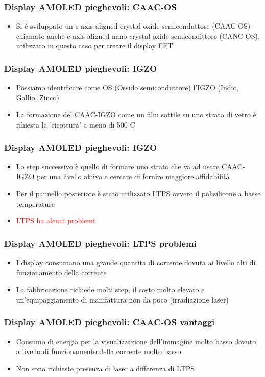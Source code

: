 \documentclass[12pt]{beamer}
\begin{document}
	\begin{frame}
		\frametitle{Display AMOLED pieghevoli: CAAC-OS}
		\begin{itemize}
			\item Si è sviluppato un c-axis-aligned-crystal oxide semiconduttore (CAAC-OS) chiamato anche c-axis-aligned-nano-crystal oxide semicondittore (CANC-OS), utilizzato in questo caso per creare il display FET
		\end{itemize}
	\end{frame}
	\begin{frame}
		\frametitle{Display AMOLED pieghevoli: IGZO}
		\begin{itemize}
			\item Possiamo identificare come OS (Ossido semiconduttore) l'IGZO (Indio, Gallio, Zinco)
			\pause
			\item La formazione del CAAC-IGZO come un film sottile su uno strato di vetro è rihiesta la 'ricottura' a meno di 500 \degree C
		\end{itemize}
	\end{frame}
	\begin{frame}
		\frametitle{Display AMOLED pieghevoli: IGZO}
		\begin{itemize}
			\item Lo step successivo è quello di formare uno strato che va ad usare CAAC-IGZO per una livello attivo e cercare di fornire maggiore affidabilità
			\pause
			\item Per il pannello posteriore è stato utilizzato LTPS ovvero il polisilicone a basse temperature
			\pause
			\item \textcolor{red}{LTPS ha alcuni problemi}
		\end{itemize}
	\end{frame}
	\begin{frame}
		\frametitle{Display AMOLED pieghevoli: LTPS problemi}
		\begin{itemize}
			\item I display consumano una grande quantita di corrente dovuta ai livello alti di funzionamento della corrente
			\pause
			\item La fabbricazione richiede molti step, il costo molto elevato e un'equipaggiamento di manifattura non da poco (irradiazione laser)
		\end{itemize}
	\end{frame}
	\begin{frame}
		\frametitle{Display AMOLED pieghevoli: CAAC-OS vantaggi}
		\begin{itemize}
			\item Consumo di energia per la visualizzazione dell'immagine molto basso dovuto a livello di funzionamento della corrente molto basso
			\pause
			\item Non sono richieste presenza di laser a differenza di LTPS
		\end{itemize}
	\end{frame}
\end{document}
